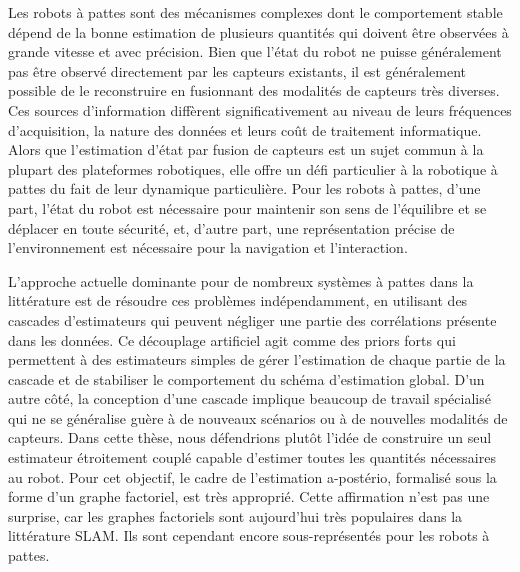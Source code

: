 Les robots à pattes sont des mécanismes complexes dont le comportement stable dépend de la bonne estimation de plusieurs quantités 
qui doivent être observées à grande vitesse et avec précision. Bien que l'état du robot ne puisse généralement pas être observé directement par 
les capteurs existants, il est généralement possible de le reconstruire en fusionnant des modalités de capteurs très diverses.
Ces sources d'information diffèrent significativement au niveau de leurs fréquences d'acquisition, la nature des données et leurs coût de traitement informatique.
Alors que l'estimation d'état par fusion de capteurs est un sujet commun à la plupart des plateformes robotiques, elle offre un défi particulier à la 
robotique à pattes du fait de leur dynamique particulière.
Pour les robots à pattes, d'une part, l'état du robot est nécessaire pour maintenir son sens de l'équilibre et se déplacer en toute sécurité, et, 
d'autre part, une représentation précise de l'environnement est nécessaire pour la navigation et l'interaction.

L'approche actuelle dominante pour de nombreux systèmes à pattes dans la littérature est de résoudre ces problèmes
indépendamment, en utilisant des cascades d'estimateurs qui peuvent négliger une partie des corrélations présente dans les données.
Ce découplage artificiel agit comme des priors forts qui permettent à des estimateurs simples de gérer l'estimation de chaque partie de la cascade et de stabiliser 
le comportement du schéma d'estimation global. D'un autre côté, la conception d'une cascade implique beaucoup de travail spécialisé qui ne se généralise guère à de 
nouveaux scénarios ou à de nouvelles modalités de capteurs.
Dans cette thèse, nous défendrions plutôt l'idée de construire un seul estimateur étroitement couplé capable d'estimer toutes les quantités nécessaires au robot.
Pour cet objectif, le cadre de l'estimation a-postério, formalisé sous la forme d'un graphe factoriel, est très approprié. Cette affirmation n'est pas une surprise, 
car les graphes factoriels sont aujourd'hui très populaires dans la littérature SLAM. Ils sont cependant encore sous-représentés pour les robots à pattes.

